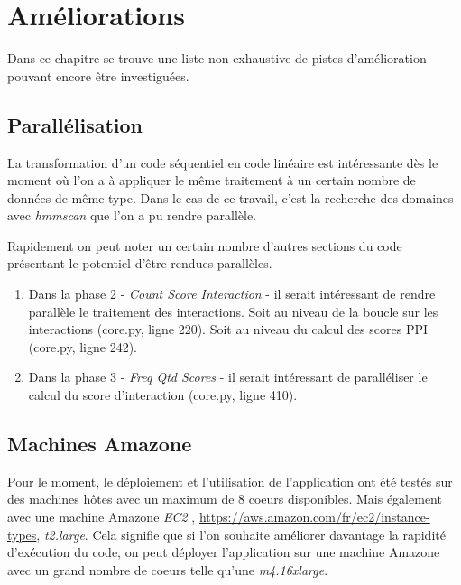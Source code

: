 \chapter{Améliorations}
\label{ch:improve}

Dans ce chapitre se trouve une liste non exhaustive de pistes d'amélioration pouvant encore être investiguées.

\section{Parallélisation}

La transformation d'un code séquentiel en code linéaire est intéressante dès le moment où l'on a à appliquer le même traitement à un certain nombre de données de même type. Dans le cas de ce travail, c'est la recherche des domaines avec \emph{hmmscan} que l'on a pu rendre parallèle.

Rapidement on peut noter un certain nombre d'autres sections du code présentant le potentiel d'être rendues parallèles.

\begin{enumerate} \item Dans la phase 2 - \emph{Count Score Interaction} - il serait intéressant de rendre parallèle le traitement des interactions. Soit au niveau de la boucle sur les interactions (core.py, ligne 220). Soit au niveau du calcul des scores PPI (core.py, ligne 242).
\item Dans la phase 3 - \emph{Freq Qtd Scores} - il serait intéressant de paralléliser le calcul du score d'interaction (core.py, ligne 410).
\end{enumerate}

\section{Machines Amazone}

Pour le moment, le déploiement et l'utilisation de l'application ont été testés sur des machines hôtes avec un maximum de 8 coeurs disponibles. Mais également avec une machine Amazone \emph{EC2} \cite{10}, \url{https://aws.amazon.com/fr/ec2/instance-types}, \emph{t2.large}. Cela signifie que si l'on souhaite améliorer davantage la rapidité d'exécution du code, on peut déployer l'application sur une machine Amazone avec un grand nombre de coeurs telle qu'une \emph{m4.16xlarge}.
